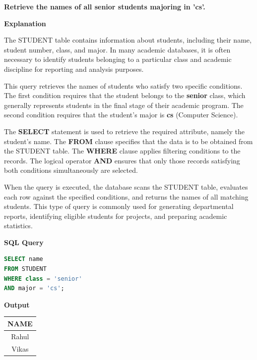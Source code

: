 \documentclass[12pt,a4paper]{report}
\begin{document}
\textbf{Retrieve the names of all senior students majoring in 'cs'.}

\vspace{0.4cm}

\textbf{Explanation}

The STUDENT table contains information about students, including their name, student number, class, and major. In many academic databases, it is often necessary to identify students belonging to a particular class and academic discipline for reporting and analysis purposes.

This query retrieves the names of students who satisfy two specific conditions. The first condition requires that the student belongs to the \textbf{senior} class, which generally represents students in the final stage of their academic program. The second condition requires that the student's major is \textbf{cs} (Computer Science).

The \textbf{SELECT} statement is used to retrieve the required attribute, namely the student's name. The \textbf{FROM} clause specifies that the data is to be obtained from the STUDENT table. The \textbf{WHERE} clause applies filtering conditions to the records. The logical operator \textbf{AND} ensures that only those records satisfying both conditions simultaneously are selected.

When the query is executed, the database scans the STUDENT table, evaluates each row against the specified conditions, and returns the names of all matching students. This type of query is commonly used for generating departmental reports, identifying eligible students for projects, and preparing academic statistics.

\vspace{0.4cm}

\textbf{SQL Query}

\begin{lstlisting}[language=SQL]
SELECT name
FROM STUDENT
WHERE class = 'senior'
AND major = 'cs';
\end{lstlisting}

\vspace{0.5cm}

\textbf{Output}

\vspace{0.3cm}

\begin{center}
\renewcommand{\arraystretch}{1.6}
\begin{tabular}{|c|}
\hline
\textbf{NAME} \\
\hline
Rahul \\
\hline
Vikas \\
\hline
\end{tabular}
\end{center}
\end{document}
